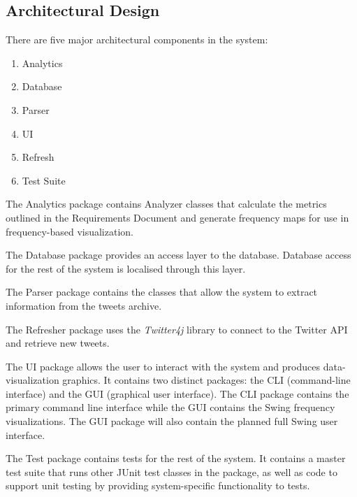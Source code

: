 \documentclass[a4paper, 12pt]{article}
\begin{document}
\subsection{Architectural Design} \label{sec:design}
\begin{adjustwidth}{2em}{0pt}
There are five major architectural components in the system:
\begin{enumerate}
\item Analytics
\item Database
\item Parser
\item UI
\item Refresh
\item Test Suite
\end{enumerate}

\noindent The Analytics package contains Analyzer classes that calculate the metrics outlined in the Requirements Document and generate frequency maps for use in frequency-based visualization. \newline

\noindent The Database package provides an access layer to the database. Database access for the rest of the system is localised through this layer.\newline

\noindent The Parser package contains the classes that allow the system to extract information from the tweets archive. \newline

\noindent The Refresher package uses the \textit{Twitter4j} library to connect to the Twitter API and retrieve new tweets. \newline

\noindent The UI package allows the user to interact with the system and produces data-visualization graphics. It contains two distinct packages: the CLI (command-line interface) and the GUI (graphical user interface). The CLI package contains the primary command line interface while the GUI contains the Swing frequency visualizations. The GUI package will also contain the planned full Swing user interface. \newline

\noindent The Test package contains tests for the rest of the system. It contains a master test suite that runs other JUnit test classes in the package, as well as code to support unit testing by providing system-specific functionality to tests. \newline


\end{adjustwidth}
\end{document}
